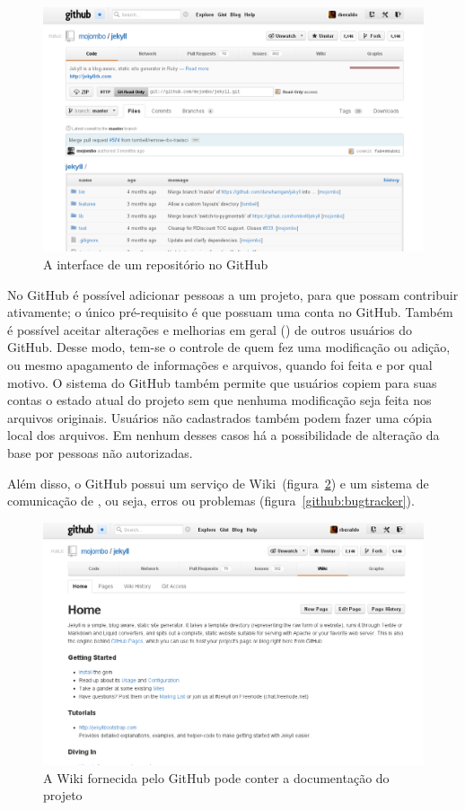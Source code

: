 \begin{figure}[h]
  \centering
  \includegraphics[width=.9\textwidth]{img/repositorio.png}
  \caption{A interface de um repositório no GitHub}
  \label{github:repositorio}
\end{figure}

No GitHub é possível adicionar pessoas a um projeto, para que possam
contribuir ativamente; o único pré-requisito é que possuam uma conta no GitHub.
Também é possível aceitar alterações e melhorias em geral () de outros usuários do GitHub. Desse modo, tem-se o controle de
quem fez uma modificação ou adição, ou mesmo apagamento de informações e
arquivos, quando foi feita e por qual motivo. O sistema do GitHub também
permite que usuários copiem para suas contas o estado atual do projeto sem que
nenhuma modificação seja feita nos arquivos originais. Usuários não cadastrados
também podem fazer uma cópia local dos arquivos. Em nenhum desses casos há a
possibilidade de alteração da base por pessoas não autorizadas.

Além disso, o GitHub possui um serviço de Wiki~(figura~\ref{github:wiki}) e um
sistema de comunicação de , ou seja, erros ou problemas
(figura~\ref{github:bugtracker}).

 \begin{figure}[h]
   \centering
   \includegraphics[width=.9\textwidth]{img/wiki.png}
   \caption{A Wiki fornecida pelo GitHub pode conter a documentação do projeto}
   \label{github:wiki}
 \end{figure}
 
